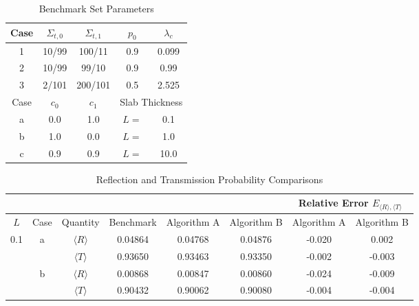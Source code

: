 \documentclass{style/nseJournal}
\begin{document}
\begin{table}%
\centering
\caption{Benchmark Set Parameters}
\label{tab:params}
\begin{tabular}{|ccccc|}
\hline
    Case & \(\Sigma_{t,0}\) & \(\Sigma_{t,1}\) & \(p_0\) & \(\lambda_c\) \\ \hline
    1               & 10/99 & 100/11 & 0.9 & 0.099\\
    2               & 10/99 & 99/10   & 0.9 & 0.99 \\
    3               & 2/101 & 200/101  & 0.5 & 2.525 \\ \hline
\hline
    Case  & $c_0$ & $c_1$ &  \multicolumn{2}{|c|}{Slab Thickness}  \\ \hline
    a               & 0.0 & 1.0 & \multicolumn{1}{|c}{\(L=\)} & 0.1 \\
    b               & 1.0 & 0.0 & \multicolumn{1}{|c}{\(L=\)} & 1.0 \\
    c               & 0.9 & 0.9 & \multicolumn{1}{|c}{\(L=\)} & 10.0 \\ \hline
\end{tabular}
\end{table}

\begin{table}[b]%
\centering
\caption{Reflection and Transmission Probability Comparisons}
\label{tab:results}
\begin{tabular}{|c|c|c|c|c|c|c|c|}
\hline
            &         &              &                 &                   &                  & \multicolumn{2}{c|}{Relative Error $E_{\langle R \rangle,\langle T \rangle}$} \\\hline
    \(L\)   & Case & Quantity & Benchmark & Algorithm A & Algorithm B & Algorithm A & Algorithm B \\ \hline \hline
    \multirow{4}{*}{0.1}   & \multirow{2}{*}{a} & \(\langle R \rangle\) & 0.04864 & 0.04768 & 0.04876 & -0.020 & 0.002 \\
                                     &                              & \(\langle T \rangle\) & 0.93650 & 0.93463 & 0.93350 & -0.002 & -0.003 \\ \cline{2-8}
                                     & \multirow{2}{*}{b} & \(\langle R \rangle\) & 0.00868 & 0.00847 & 0.00860 & -0.024 & -0.009 \\
                                     &                              & \(\langle T \rangle\) & 0.90432 & 0.90062 & 0.90080 & -0.004 & -0.004 \\ \hline
\end{tabular}
\end{table}
\end{document}

